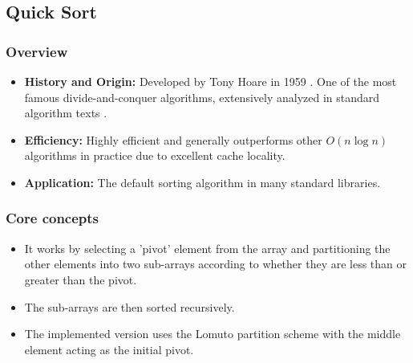 \subsection[Quick Sort]{Quick Sort \cite{nebel2014pivot}}
    \subsubsection{Overview}
        \begin{itemize}
            \item \textbf{History and Origin:} Developed by Tony Hoare in 1959 \cite{hoare1962quicksort}. One of the most famous divide-and-conquer algorithms, extensively analyzed in standard algorithm texts \cite{cormen2009introduction}.
            \item \textbf{Efficiency:} Highly efficient and generally outperforms other $O(n \log n)$ algorithms in practice due to excellent cache locality.
            \item \textbf{Application:} The default sorting algorithm in many standard libraries.
        \end{itemize}
    \subsubsection{Core concepts}
        \begin{itemize}
            \item It works by selecting a 'pivot' element from the array and partitioning the other elements into two sub-arrays according to whether they are less than or greater than the pivot.
            \item The sub-arrays are then sorted recursively.
            \item The implemented version uses the Lomuto partition scheme with the middle element acting as the initial pivot.
        \end{itemize}

